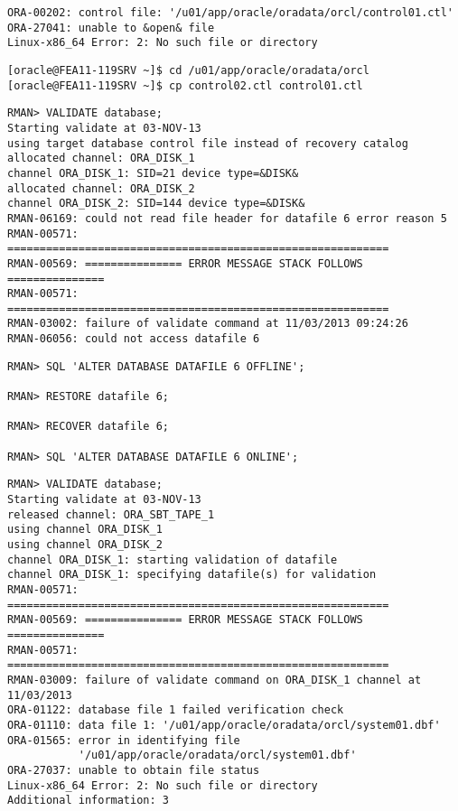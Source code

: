 \begin{enumerate}
\begin{lstlisting}[caption={Ermitteln der betroffenen Kontrolldatei im Alert Log},language=terminal]
ORA-00202: control file: '/u01/app/oracle/oradata/orcl/control01.ctl'
ORA-27041: unable to &open& file
Linux-x86_64 Error: 2: No such file or directory
      \end{lstlisting}
      \begin{lstlisting}[caption={Recovern der Kontrolldatei},language=terminal]
[oracle@FEA11-119SRV ~]$ cd /u01/app/oracle/oradata/orcl
[oracle@FEA11-119SRV ~]$ cp control02.ctl control01.ctl
      \end{lstlisting}
    
      \begin{lstlisting}[caption={Recovern der Datendatei},language=rman]
RMAN> VALIDATE database;
Starting validate at 03-NOV-13
using target database control file instead of recovery catalog
allocated channel: ORA_DISK_1
channel ORA_DISK_1: SID=21 device type=&DISK&
allocated channel: ORA_DISK_2
channel ORA_DISK_2: SID=144 device type=&DISK&
RMAN-06169: could not read file header for datafile 6 error reason 5
RMAN-00571: ===========================================================
RMAN-00569: =============== ERROR MESSAGE STACK FOLLOWS ===============
RMAN-00571: ===========================================================
RMAN-03002: failure of validate command at 11/03/2013 09:24:26
RMAN-06056: could not access datafile 6
      \end{lstlisting}
\clearpage
      \begin{lstlisting}[language=rman,emph={[9]ALTER,DATABASE, DATAFILE,OFFLINE,ONLINE},emphstyle={[9]\color{magenta}\bfseries}]
RMAN> SQL 'ALTER DATABASE DATAFILE 6 OFFLINE';

RMAN> RESTORE datafile 6;

RMAN> RECOVER datafile 6;

RMAN> SQL 'ALTER DATABASE DATAFILE 6 ONLINE';
      \end{lstlisting}
    
      \begin{lstlisting}[caption={Recovern der Systemdatendatei},language=rman,alsolanguage=sqlplus,emph={[9]ALTER,DATABASE,OPEN},emphstyle={[9]\color{magenta}\bfseries}]
RMAN> VALIDATE database; 
Starting validate at 03-NOV-13
released channel: ORA_SBT_TAPE_1
using channel ORA_DISK_1
using channel ORA_DISK_2
channel ORA_DISK_1: starting validation of datafile
channel ORA_DISK_1: specifying datafile(s) for validation
RMAN-00571: ===========================================================
RMAN-00569: =============== ERROR MESSAGE STACK FOLLOWS ===============
RMAN-00571: ===========================================================
RMAN-03009: failure of validate command on ORA_DISK_1 channel at 11/03/2013
ORA-01122: database file 1 failed verification check
ORA-01110: data file 1: '/u01/app/oracle/oradata/orcl/system01.dbf'
ORA-01565: error in identifying file 
           '/u01/app/oracle/oradata/orcl/system01.dbf'
ORA-27037: unable to obtain file status
Linux-x86_64 Error: 2: No such file or directory
Additional information: 3


\end{lstlisting}
\end{enumerate}
